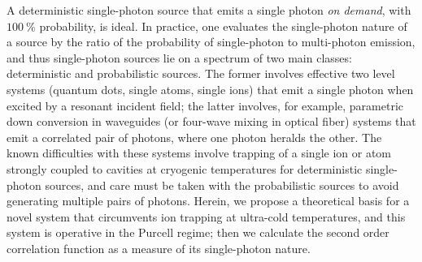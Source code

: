 \documentclass[12pt]{article}
\begin{document}
A deterministic single-photon source that emits a single photon \textit{on demand}, 
with $100 \: \%$ probability, is ideal. In practice, one evaluates the 
single-photon nature of a source by the ratio of the probability of single-photon 
to multi-photon emission, and thus single-photon sources lie on a spectrum of 
two main classes: deterministic and probabilistic sources. \cite{lounis2005single, 
eisaman2011invited} The former involves effective two level systems (quantum
dots, single atoms, single ions) \cite{ShieldsAndrewJ2007Sqls, strauf2007high, 
hennrich2004photon, wilk2007single, maurer2004single} that emit a single photon when 
excited by a resonant incident field; the latter involves, for example, parametric 
down conversion in waveguides (or four-wave mixing in optical fiber) systems
\cite{u2004efficient, sharping2001observation, goldschmidt2008spectrally} 
that emit a correlated pair of photons, where one photon heralds the other. 
The known difficulties with these systems involve trapping of a single ion or atom 
strongly coupled to cavities at cryogenic temperatures for deterministic single-photon 
sources, and care must be taken with the probabilistic sources to avoid generating 
multiple pairs of photons. Herein, we propose a theoretical basis for a novel system that 
circumvents ion trapping at ultra-cold temperatures, and this system is operative in the 
Purcell regime; then we calculate the second order correlation function as a measure of 
its single-photon nature.
\end{document}
